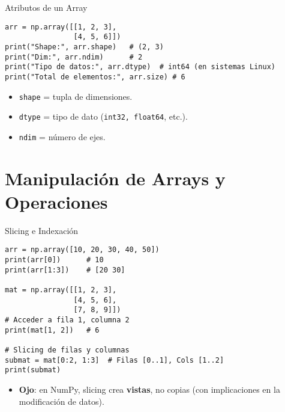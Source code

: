 \documentclass[10pt]{beamer}
\begin{document}
\begin{frame}[fragile]{Atributos de un Array}
\begin{verbatim}
arr = np.array([[1, 2, 3],
                [4, 5, 6]])
print("Shape:", arr.shape)   # (2, 3)
print("Dim:", arr.ndim)      # 2
print("Tipo de datos:", arr.dtype)  # int64 (en sistemas Linux)
print("Total de elementos:", arr.size) # 6
\end{verbatim}
\begin{itemize}
  \item \texttt{shape} = tupla de dimensiones.
  \item \texttt{dtype} = tipo de dato (\texttt{int32, float64}, etc.).
  \item \texttt{ndim} = número de ejes.
\end{itemize}
\end{frame}

\section{Manipulación de Arrays y Operaciones}

\begin{frame}[fragile]{Slicing e Indexación}
\begin{verbatim}
arr = np.array([10, 20, 30, 40, 50])
print(arr[0])      # 10
print(arr[1:3])    # [20 30]

mat = np.array([[1, 2, 3],
                [4, 5, 6],
                [7, 8, 9]])
# Acceder a fila 1, columna 2
print(mat[1, 2])   # 6

# Slicing de filas y columnas
submat = mat[0:2, 1:3]  # Filas [0..1], Cols [1..2]
print(submat)
\end{verbatim}
\begin{itemize}
  \item \textbf{Ojo}: en NumPy, slicing crea \textbf{vistas}, no copias (con implicaciones en la modificación de datos).
\end{itemize}
\end{frame}
\end{document}
